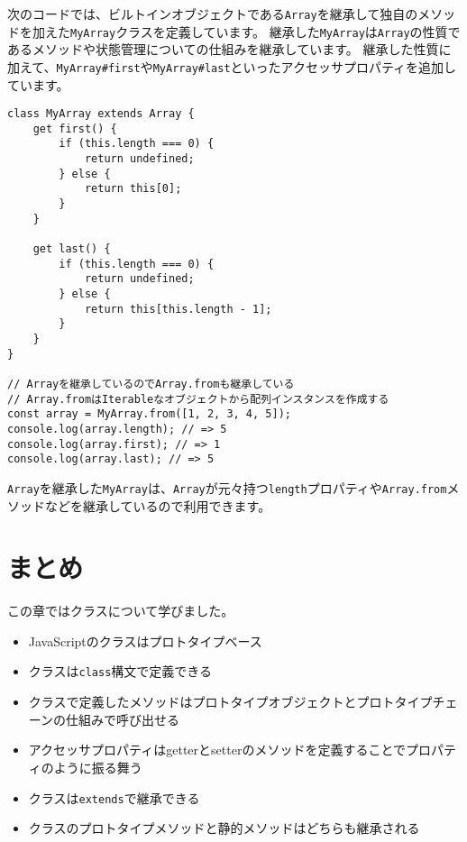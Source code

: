 次のコードでは、ビルトインオブジェクトである\texttt{Array}を継承して独自のメソッドを加えた\texttt{MyArray}クラスを定義しています。
継承した\texttt{MyArray}は\texttt{Array}の性質であるメソッドや状態管理についての仕組みを継承しています。
継承した性質に加えて、\texttt{MyArray\#first}や\texttt{MyArray\#last}といったアクセッサプロパティを追加しています。

\begin{lstlisting}
class MyArray extends Array {
    get first() {
        if (this.length === 0) {
            return undefined;
        } else {
            return this[0];
        }
    }

    get last() {
        if (this.length === 0) {
            return undefined;
        } else {
            return this[this.length - 1];
        }
    }
}

// Arrayを継承しているのでArray.fromも継承している
// Array.fromはIterableなオブジェクトから配列インスタンスを作成する
const array = MyArray.from([1, 2, 3, 4, 5]);
console.log(array.length); // => 5
console.log(array.first); // => 1
console.log(array.last); // => 5
\end{lstlisting}

\texttt{Array}を継承した\texttt{MyArray}は、\texttt{Array}が元々持つ\texttt{length}プロパティや\texttt{Array.from}メソッドなどを継承しているので利用できます。

\hypertarget{conclusion}{%
\section{まとめ}\label{conclusion}}

この章ではクラスについて学びました。

\begin{itemize}
\item
  JavaScriptのクラスはプロトタイプベース
\item
  クラスは\texttt{class}構文で定義できる
\item
  クラスで定義したメソッドはプロトタイプオブジェクトとプロトタイプチェーンの仕組みで呼び出せる
\item
  アクセッサプロパティはgetterとsetterのメソッドを定義することでプロパティのように振る舞う
\item
  クラスは\texttt{extends}で継承できる
\item
  クラスのプロトタイプメソッドと静的メソッドはどちらも継承される
\end{itemize}
